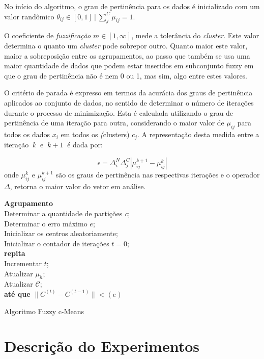\documentclass[12pt,a4paper]{article}
\numberwithin{equation}{section}
\begin{document}
No início do algoritmo, o grau de pertinência para os dados é inicializado com um valor randômico $\theta_{ij}\in{[0,1]} ~|~\sum_{j}^{C}\mu_{ij}=1$.

O coeficiente de \textit{fuzzificação} $m \in [1,\infty]$, mede a tolerância do \textit{cluster}. Este valor determina o quanto um \textit{cluster} pode sobrepor outro. Quanto maior este valor, maior a sobreposição entre os agrupamentos, ao passo que também se usa uma maior quantidade de dados que podem estar inseridos em subconjunto fuzzy em que o grau de pertinência não é nem 0 ou 1, mas sim, algo entre estes valores.

O critério de parada é expresso em termos da acurácia dos graus de pertinência aplicados ao conjunto de dados, no sentido de determinar o número de iterações durante o processo de minimização. Esta é calculada utilizando o grau de pertinência de uma iteração para outra, considerando o maior valor de $\mu_{ij}$ para todos os dados $x_{i}$ em todos os \textit(clusters) $c_{j}$. A representação desta medida entre a iteração $~k~$ e $~k+1~$ é dada por:

\begin{equation}
\epsilon=\Delta_{i}^{N}\Delta_{j}^{C}|\mu_{ij}^{k+1} - \mu_{ij}^{k}| 
\end{equation}
onde $\mu_{ij}^{k}$ e $\mu_{ij}^{k+1}$ são os graus de pertinência nas respectivas iterações e o operador $\Delta$, retorna o maior valor do vetor em análise.

\begin{algorithm}[H]
	\textbf{Agrupamento}\\
	Determinar a quantidade de partições \textit{c}; \\
	Determinar o erro máximo $e$;\\
	Inicializar os centros aleatoriamente;\\
	Inicializar o contador de iterações $t=0$;\\
	\textbf{repita}\\
	Incrementar $t$;\\
	Atualizar $\mu_{h}$;\\
	Atualizar $\mathcal{C}$;\\
	\textbf{até que} $\lVert C^{(t)}-C^{(t-1)} \rVert$$<(e)$
	\caption{Algoritmo Fuzzy c-Means}
\end{algorithm}

\section{Descrição do Experimentos}
\label{section:descr}
\end{document}
